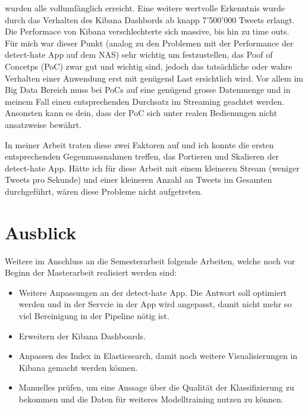 wurden alle vollumf{\"a}nglich erreicht. Eine weitere wertvolle Erkenntnis wurde durch das Verhalten des Kibana Dashbords ab knapp 7'500'000 Tweets erlangt. Die Performace von Kibana verschlechterte sich massive, bis hin zu time outs. F{\"u}r mich war dieser Punkt (analog zu den Problemen mit der Performance der detect-hate App auf dem NAS) sehr wichtig um festzustellen, das Poof of Concetps (PoC) zwar gut und wichtig sind, jedoch das tats{\"a}chliche oder wahre Verhalten einer Anwendung erst mit gen{\"u}gend Last ersichtlich wird. Vor allem im Big Data Bereich muss bei PoCs auf eine gen{\"u}gend grosse Datenmenge und in meinem Fall einen entsprechenden Durchsatz im Streaming geachtet werden. Ansonsten kann es dein, dass der PoC sich unter realen Bedienungen nicht ansatzweise bew{\"a}hrt. 

In meiner Arbeit traten diese zwei Faktoren auf und ich konnte die ersten entsprechenden Gegenmassnahmen treffen, das Portieren und Skalieren der detect-hate App. H{\"a}tte ich f{\"u}r diese Arbeit mit einem kleineren Stream (weniger Tweets pro Sekunde) und einer kleineren Anzahl an Tweets im Gesamten durchgef{\"u}hrt, w{\"a}ren diese Probleme nicht aufgetreten.


\section{Ausblick}
Weitere im Anschluss an die Semesterarbeit folgende Arbeiten, welche noch vor Beginn der Masterarbeit realisiert werden sind:

\begin{itemize}
  \item Weitere Anpassungen an der detect-hate App. Die Antwort soll optimiert werden und in der Servcie in der App wird angepasst, damit nicht mehr so viel Bereinigung in der Pipeline n{\"o}tig ist.
  \item Erweitern der Kibana Dashboards.
  \item Anpassen des Index in Elasticsearch, damit noch weitere Visualisierungen in Kibana gemacht werden k{\"o}nnen.
  \item Manuelles pr{\"u}fen, um eine Aussage {\"u}ber die Qualit{\"a}t der Klassifizierung zu bekommen und die Daten f{\"u}r weiteres Modelltraining nutzen zu k{\"o}nnen.
\end{itemize}


